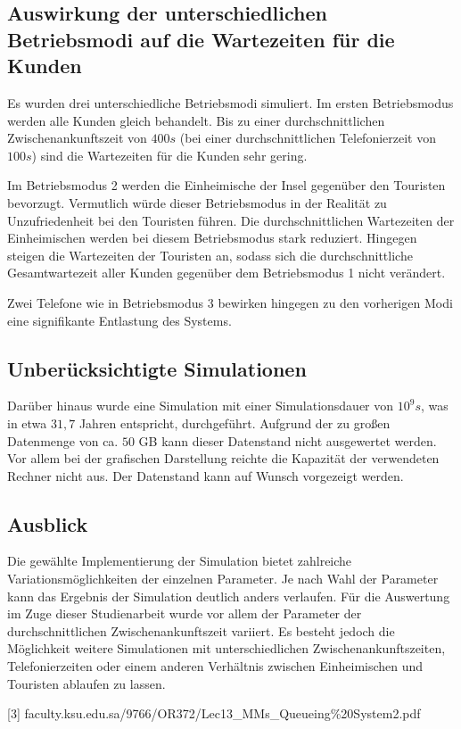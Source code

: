 \subsection{Auswirkung der unterschiedlichen Betriebsmodi auf die Wartezeiten für die Kunden}
Es wurden drei unterschiedliche Betriebsmodi simuliert. Im ersten Betriebsmodus werden alle Kunden gleich behandelt. Bis zu einer durchschnittlichen Zwischenankunftszeit von $400s$ (bei einer durchschnittlichen Telefonierzeit von $100s$) sind die Wartezeiten für die Kunden sehr gering.

Im Betriebsmodus 2 werden die Einheimische der Insel gegenüber den Touristen bevorzugt. Vermutlich würde dieser Betriebsmodus in der Realität zu Unzufriedenheit bei den Touristen führen. Die durchschnittlichen Wartezeiten der Einheimischen werden bei diesem Betriebsmodus stark reduziert. Hingegen steigen die Wartezeiten der Touristen an, sodass sich die durchschnittliche Gesamtwartezeit aller Kunden gegenüber dem Betriebsmodus 1 nicht verändert.

Zwei Telefone wie in Betriebsmodus 3 bewirken hingegen zu den vorherigen Modi eine signifikante Entlastung des Systems.


\subsection{Unberücksichtigte Simulationen}
Darüber hinaus wurde eine Simulation mit einer Simulationsdauer von $10^9s$, was in etwa $31,7$ Jahren entspricht, durchgeführt. Aufgrund der zu großen Datenmenge von ca. $50$ GB kann dieser Datenstand nicht ausgewertet werden. Vor allem bei der grafischen Darstellung reichte die Kapazität der verwendeten Rechner nicht aus. Der Datenstand kann auf Wunsch vorgezeigt werden.

\subsection{Ausblick}

Die gewählte Implementierung der Simulation bietet zahlreiche Variationsmöglichkeiten der einzelnen Parameter. Je nach Wahl der Parameter kann das Ergebnis der Simulation deutlich anders verlaufen. Für die Auswertung im Zuge dieser Studienarbeit wurde vor allem der Parameter der durchschnittlichen Zwischenankunftszeit variiert. Es besteht jedoch die Möglichkeit weitere Simulationen mit unterschiedlichen Zwischenankunftszeiten, Telefonierzeiten oder einem anderen Verhältnis zwischen Einheimischen und Touristen ablaufen zu lassen.



%


[3] faculty.ksu.edu.sa/9766/OR372/Lec13\_MMs\_Queueing\%20System2.pdf


